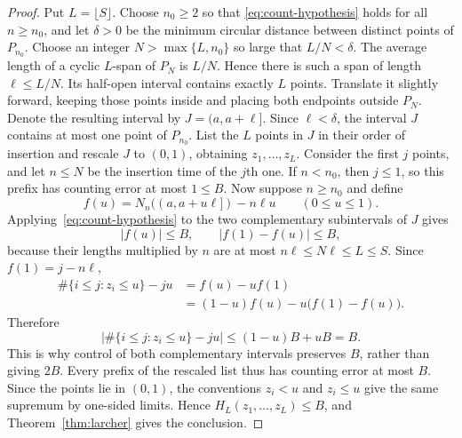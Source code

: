 \documentclass[11pt]{article}
\theoremstyle{remark}
\numberwithin{equation}{section}
\begin{document}
\begin{proof}
Put $L=\lfloor S\rfloor$. Choose $n_0\geq2$ so that
\eqref{eq:count-hypothesis} holds for all $n\geq n_0$, and let $\delta>0$
be the minimum circular distance between distinct points of $P_{n_0}$.
Choose an integer $N>\max\{L,n_0\}$ so large that $L/N<\delta$.
The average length of a cyclic $L$-span of $P_N$ is $L/N$. Hence there is
such a span of length $\ell\leq L/N$. Its half-open interval contains
exactly $L$ points. Translate it slightly forward, keeping those points
inside and placing both endpoints outside $P_N$. Denote the resulting
interval by $J=(a,a+\ell]$. Since $\ell<\delta$, the interval $J$ contains
at most one point of $P_{n_0}$.
List the $L$ points in $J$ in their order of insertion and rescale $J$ to
$(0,1)$, obtaining $z_1,\ldots,z_L$. Consider the first $j$ points, and
let $n\leq N$ be the insertion time of the $j$th one. If $n<n_0$, then
$j\leq1$, so this prefix has counting error at most $1\leq B$.
Now suppose $n\geq n_0$ and define
\[
  f(u)=N_n((a,a+u\ell])-n\ell u
  \qquad(0\leq u\leq1).
\]
Applying~\eqref{eq:count-hypothesis} to the two complementary subintervals
of $J$ gives
\[
  |f(u)|\leq B,
  \qquad
  |f(1)-f(u)|\leq B,
\]
because their lengths multiplied by $n$ are at most
$n\ell\leq N\ell\leq L\leq S$. Since $f(1)=j-n\ell$,
\[
  \begin{aligned}
    \#\{i\leq j:z_i\leq u\}-ju
    &=f(u)-uf(1)\\
    &=(1-u)f(u)-u\bigl(f(1)-f(u)\bigr).
  \end{aligned}
\]
Therefore
\[
  \left|\#\{i\leq j:z_i\leq u\}-ju\right|
  \leq(1-u)B+uB=B.
\]
This is why control of both complementary intervals preserves $B$,
rather than giving $2B$.
Every prefix of the rescaled list thus has counting error at most $B$.
Since the points lie in $(0,1)$, the conventions $z_i<u$ and $z_i\leq u$
give the same supremum by one-sided limits. Hence
$H_L(z_1,\ldots,z_L)\leq B$, and Theorem~\ref{thm:larcher} gives the
conclusion.
\end{proof}
\end{document}

